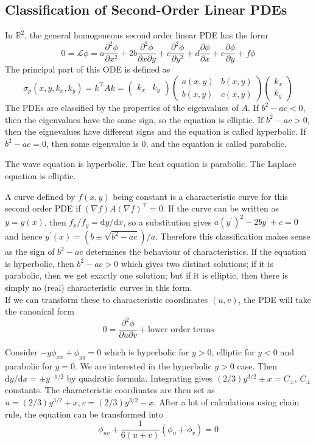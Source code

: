 \subsection{Classification of Second-Order Linear PDEs}
In $\mathbb R^2$, the general homogeneous second order linear PDE has the form
$$0=\mathcal L\phi=a\frac{\partial^2\phi}{\partial x^2}+2b\frac{\partial^2\phi}{\partial x\partial y}+c\frac{\partial^2\phi}{\partial y^2}+d\frac{\partial\phi}{\partial x}+e\frac{\partial\phi}{\partial y}+f\phi$$
The principal part of this ODE is defined as
$$\sigma_p(x,y,k_x,k_y)=k^\top Ak=\begin{pmatrix}
    k_x&k_y
\end{pmatrix}\begin{pmatrix}
    a(x,y)&b(x,y)\\
    b(x,y)&c(x,y)
\end{pmatrix}\begin{pmatrix}
    k_x\\
    k_y
\end{pmatrix}$$
The PDEs are classified by the properties of the eigenvalues of $A$.
If $b^2-ac<0$, then the eigenvalues have the same sign, so the equation is elliptic.
If $b^2-ac>0$, then the eignevalues have different signs and the equation is called hyperbolic.
If $b^2-ac=0$, then some eigenvalue is $0$, and the equation is called parabolic.
\begin{example}
    The wave equation is hyperbolic.
    The heat equation is parabolic.
    The Laplace equation is elliptic.
\end{example}
A curve defined by $f(x,y)$ being constant is a characteristic curve for this second order PDE if $(\nabla f)A(\nabla f)^\top =0$.
If the curve can be written as $y=y(x)$, then $f_x/f_y=\mathrm dy/\mathrm dx$, so a substitution gives $a(y^\prime)^2-2by^\prime+c=0$ and hence $y^\prime(x)=(b\pm\sqrt{b^2-ac})/a$.
Therefore this classification makes sense as the sign of $b^2-ac$ determines the behaviour of characteristics.
If the equation is hyperbolic, then $b^2-ac>0$ which gives two distinct solutions;
if it is parabolic, then we get exactly one solution;
but if it is elliptic, then there is simply no (real) characteristic curves in this form.\\
If we can transform these to characteristic coordinates $(u,v)$, the PDE will take the canonical form
$$0=\frac{\partial^2\phi}{\partial u\partial v}+\text{lower order terms}$$
\begin{example}
    Consider $-y\phi_{xx}+\phi_{yy}=0$ which is hyperbolic for $y>0$, elliptic for $y<0$ and parabolic for $y=0$.
    We are interested in the hyperbolic $y>0$ case.
    Then $\mathrm dy/\mathrm dx=\pm y^{-1/2}$ by quadratic formula.
    Integrating gives $(2/3)y^{3/2}\pm x=C_\pm$, $C_\pm$ constants.
    The characteristic coordinates are then set as $u=(2/3)y^{3/2}+ x,v=(2/3)y^{3/2}- x$.
    After a lot of calculations using chain rule, the equation can be transformed into
    $$\phi_{uv}+\frac{1}{6(u+v)}(\phi_u+\phi_v)=0$$
\end{example}
